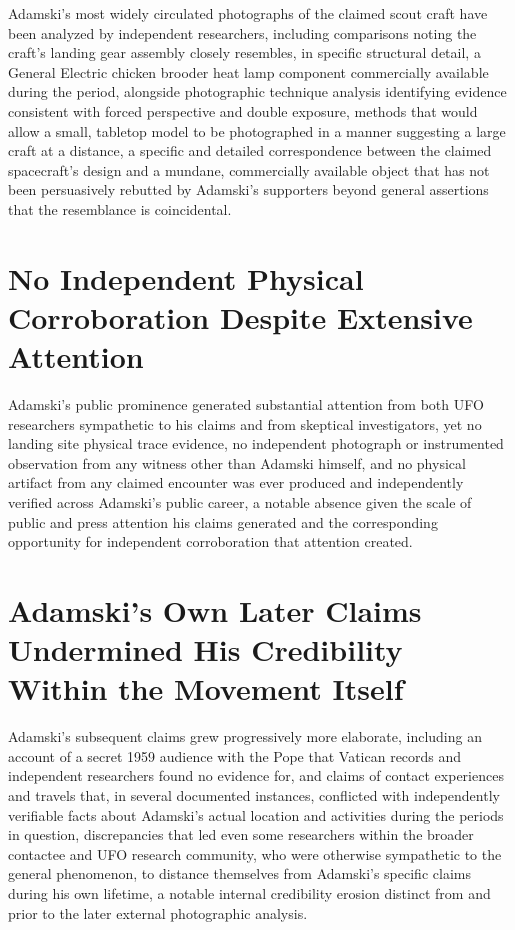 \documentclass[11pt]{article}
\begin{document}
Adamski's most widely circulated photographs of the claimed scout craft have been analyzed by independent researchers, including comparisons noting the craft's landing gear assembly closely resembles, in specific structural detail, a General Electric chicken brooder heat lamp component commercially available during the period, alongside photographic technique analysis identifying evidence consistent with forced perspective and double exposure, methods that would allow a small, tabletop model to be photographed in a manner suggesting a large craft at a distance, a specific and detailed correspondence between the claimed spacecraft's design and a mundane, commercially available object that has not been persuasively rebutted by Adamski's supporters beyond general assertions that the resemblance is coincidental.

\section{No Independent Physical Corroboration Despite Extensive Attention}

Adamski's public prominence generated substantial attention from both UFO researchers sympathetic to his claims and from skeptical investigators, yet no landing site physical trace evidence, no independent photograph or instrumented observation from any witness other than Adamski himself, and no physical artifact from any claimed encounter was ever produced and independently verified across Adamski's public career, a notable absence given the scale of public and press attention his claims generated and the corresponding opportunity for independent corroboration that attention created.

\section{Adamski's Own Later Claims Undermined His Credibility Within the Movement Itself}

Adamski's subsequent claims grew progressively more elaborate, including an account of a secret 1959 audience with the Pope that Vatican records and independent researchers found no evidence for, and claims of contact experiences and travels that, in several documented instances, conflicted with independently verifiable facts about Adamski's actual location and activities during the periods in question, discrepancies that led even some researchers within the broader contactee and UFO research community, who were otherwise sympathetic to the general phenomenon, to distance themselves from Adamski's specific claims during his own lifetime, a notable internal credibility erosion distinct from and prior to the later external photographic analysis.
\end{document}
